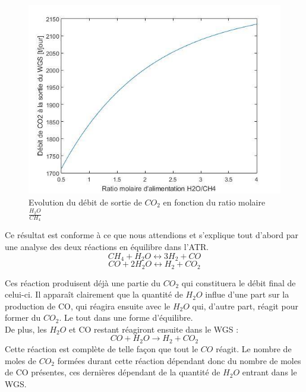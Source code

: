 \documentclass[12pt]{report}
\begin{document}
\begin{figure}[H]
\begin{center}
\includegraphics[scale=0.6]{debit_CO2_ratio_H2O}
\caption{Evolution du débit de sortie de $CO_2$ en fonction du ratio molaire $\frac{H_2O}{CH_4}$}
\end{center}
\end{figure}

Ce résultat est conforme à ce que nous attendions et s'explique tout d'abord par une analyse des deux réactions en équilibre dans l'ATR.
 \begin{equation}
 CH_4 + H_2O \leftrightarrow 3H_2 + CO
 \end{equation}
 \begin{equation}
 CO + 2H_2O \leftrightarrow H_2 + CO_2
 \end{equation}
 
Ces réaction produisent déjà une partie du $CO_2$ qui constituera le débit final de celui-ci. Il apparaît clairement que la quantité de $H_2O$ influe d'une part sur la production de CO, qui réagira ensuite avec le $H_2O$ qui, d'autre part, réagit pour former du $CO_2$. Le tout dans une forme d'équilibre.\\

De plus, les $H_2O$ et CO restant réagiront ensuite dans le WGS :
\begin{equation}
CO + H_2O \rightarrow H_2 + CO_2
\end{equation}
Cette réaction est complète de telle façon que tout le $CO$ réagit. Le nombre de moles de $CO_2$ formées durant cette réaction dépendant donc du nombre de moles de CO présentes, ces dernières dépendant de la quantité de $H_2O$ entrant dans le WGS.\\
\end{document}
